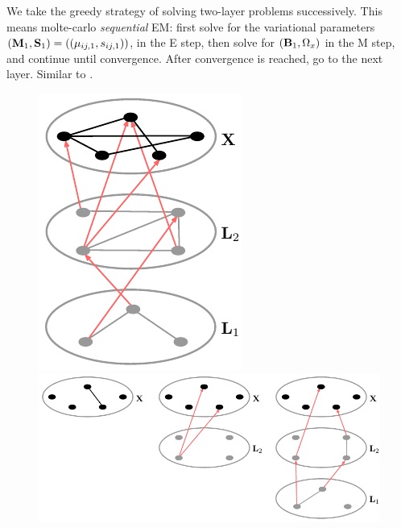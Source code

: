 \documentclass[11pt,letterpaper]{article}
\numberwithin{equation}{section}
\begin{document}
We take the greedy strategy of solving two-layer problems successively. This means molte-carlo {\it sequential} EM: first solve for the variational parameters $({\mathbf{M}}_1, {\mathbf{S}}_1) = ((\mu_{ij,1}, s_{ij,1}))$, in the E step, then solve for $({\mathbf{B}}_1,\Omega_x)$ in the M step, and continue until convergence. After convergence is reached, go to the next layer. Similar to \cite{Hinton06, Bengio07}. 


\begin{figure}[t]
\centering
\includegraphics[height=.2\textheight]{latentmultilayer}
\includegraphics[height=.2\textheight]{latentinteractions}
\end{figure}
\end{document}
